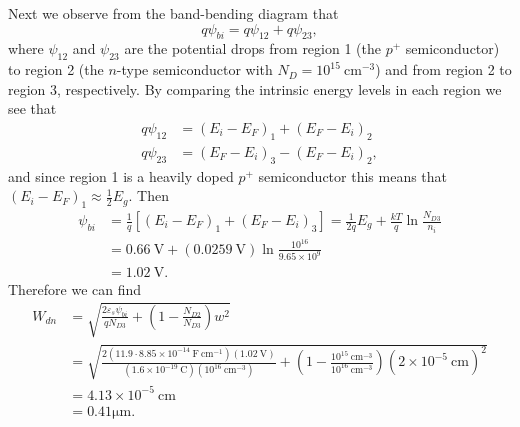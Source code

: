 \documentclass{article}
\begin{document}
Next we observe from the band-bending diagram that
$$
q \psi_{bi} = q\psi_{12} + q\psi_{23}, 
$$
where $\psi_{12}$ and $\psi_{23}$ are the potential drops from region 1 
(the $p^+$ semiconductor) to region 2 (the $n$-type semiconductor with 
$N_D = 10^{15} ~\mathrm{cm}^{-3}$) and from region 2 to region 3, respectively.
By comparing the intrinsic energy levels in each region we see that
\begin{align*}
q\psi_{12} &= (E_i - E_F)_1 + (E_F - E_i)_2 \\
q\psi_{23} &= (E_F - E_i)_3 - (E_F - E_i)_2,
\end{align*}
and since region 1 is a heavily doped $p^+$ semiconductor this means that 
$(E_i - E_F)_1 \approx \frac{1}{2} E_g$. Then
\begin{align*}
\psi_{bi} &= \frac{1}{q}[(E_i - E_F)_1 + (E_F - E_i)_3]
           = \frac{1}{2q}E_g + \frac{kT}{q} \ln \frac{N_{D3}}{n_i} \\
           &= 0.66 ~\mathrm{V} + (0.0259 ~\mathrm{V})
                     \ln \frac{10^{16}}{9.65 \times 10^{9}} \\
           &= 1.02 ~\mathrm{V}.
\end{align*}
Therefore we can find
\begin{align*}
W_{dn} &= \sqrt{\frac{2 \varepsilon_s \psi_{bi}}{q N_{D3}} 
                + \left(1 - \frac{N_{D2}}{N_{D3}}\right) w^2} \\
       &= \sqrt{\frac{2 (11.9 \cdot 8.85 \times 10^{-14} ~\mathrm{F}~\mathrm{cm}^{-1})
                       (1.02 ~\mathrm{V})}
                     {(1.6 \times 10^{-19} ~\mathrm{C})
                      (10^{16} ~\mathrm{cm}^{-3})}
                + \left(1 - \frac{10^{15} ~\mathrm{cm}^{-3}}
                                 {10^{16} ~\mathrm{cm}^{-3}}\right)
                       (2 \times 10^{-5} ~\mathrm{cm})^2} \\
       &= 4.13 \times 10^{-5} ~\mathrm{cm} \\
       &= 0.41 \mathrm{\mu m}.
\end{align*}
\end{document}
